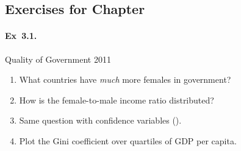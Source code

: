 \subsection*{Exercises for Chapter~}

\begin{mybox}
\paragraph{Ex~3.1.} Quality of Government 2011 %
  \begin{enumerate}
    \item What countries have \emph{much} more females in government?
    \item How is the female-to-male income ratio distributed?
    \item Same question with confidence variables ().
    \item Plot the Gini coefficient over quartiles of GDP per capita.
  \end{enumerate}
\end{mybox}
